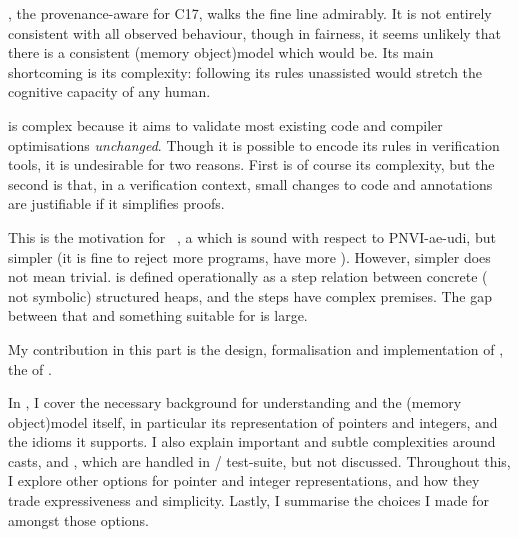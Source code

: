 , the provenance-aware  for
C17, walks the fine line admirably. It is
not entirely consistent with all observed behaviour, though in fairness, it
seems unlikely that there is a consistent \kl(memory object){model} which
would be. Its main shortcoming is its complexity: following its rules
unassisted would stretch the cognitive capacity of any human.

 is complex because it aims to validate most existing code and
compiler optimisations \emph{unchanged}. Though it is possible to encode its
rules in verification tools, it is undesirable for two reasons. First is of
course its complexity, but the second is that, in a verification context, small
changes to code and annotations are justifiable if it simplifies proofs.

This is the motivation for ~, a  which is sound with respect to PNVI-ae-udi, but simpler (it is fine to
reject more programs, \ie{} have more ). However, simpler does not mean
trivial.  is defined operationally as a step relation between concrete
(\ie{} not symbolic) structured heaps, and the steps have complex premises.
The gap between that and something suitable for  is large.

My contribution in this part is the design, formalisation and implementation
of , the  of .

In , I cover the necessary background for
understanding  and the \kl(memory object){model} itself, in
particular its representation of pointers and integers, and the idioms it
supports. I also explain important and subtle complexities around 
casts,  and , which are handled in
/ test-suite, but not discussed. Throughout this, I explore
other options for pointer and integer representations, and how they trade
expressiveness and simplicity. Lastly, I summarise the choices I made for
 amongst those options.

